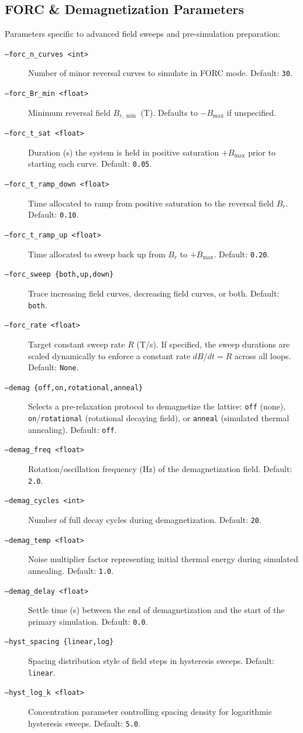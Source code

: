 \documentclass[11pt,a4paper]{article}
\newcommand{\code}[1]{\texttt{#1}}
\begin{document}
\subsection{FORC \& Demagnetization Parameters}
Parameters specific to advanced field sweeps and pre-simulation preparation:
\begin{description}
    \item[\code{--forc\_n\_curves <int>}] Number of minor reversal curves to simulate in FORC mode. Default: \code{30}.
    \item[\code{--forc\_Br\_min <float>}] Minimum reversal field $B_{r,\min}$ (\si{T}). Defaults to $-B_{\max}$ if unspecified.
    \item[\code{--forc\_t\_sat <float>}] Duration (\si{s}) the system is held in positive saturation $+B_{\max}$ prior to starting each curve. Default: \code{0.05}.
    \item[\code{--forc\_t\_ramp\_down <float>}] Time allocated to ramp from positive saturation to the reversal field $B_r$. Default: \code{0.10}.
    \item[\code{--forc\_t\_ramp\_up <float>}] Time allocated to sweep back up from $B_r$ to $+B_{\max}$. Default: \code{0.20}.
    \item[\code{--forc\_sweep \{both,up,down\}}] Trace increasing field curves, decreasing field curves, or both. Default: \code{both}.
    \item[\code{--forc\_rate <float>}] Target constant sweep rate $R$ (\si{T/s}). If specified, the sweep durations are scaled dynamically to enforce a constant rate $dB/dt = R$ across all loops. Default: \code{None}.
    \item[\code{--demag \{off,on,rotational,anneal\}}] Selects a pre-relaxation protocol to demagnetize the lattice: \code{off} (none), \code{on}/\code{rotational} (rotational decaying field), or \code{anneal} (simulated thermal annealing). Default: \code{off}.
    \item[\code{--demag\_freq <float>}] Rotation/oscillation frequency (\si{Hz}) of the demagnetization field. Default: \code{2.0}.
    \item[\code{--demag\_cycles <int>}] Number of full decay cycles during demagnetization. Default: \code{20}.
    \item[\code{--demag\_temp <float>}] Noise multiplier factor representing initial thermal energy during simulated annealing. Default: \code{1.0}.
    \item[\code{--demag\_delay <float>}] Settle time (\si{s}) between the end of demagnetization and the start of the primary simulation. Default: \code{0.0}.
    \item[\code{--hyst\_spacing \{linear,log\}}] Spacing distribution style of field steps in hysteresis sweeps. Default: \code{linear}.
    \item[\code{--hyst\_log\_k <float>}] Concentration parameter controlling spacing density for logarithmic hysteresis sweeps. Default: \code{5.0}.
\end{description}
\end{document}
